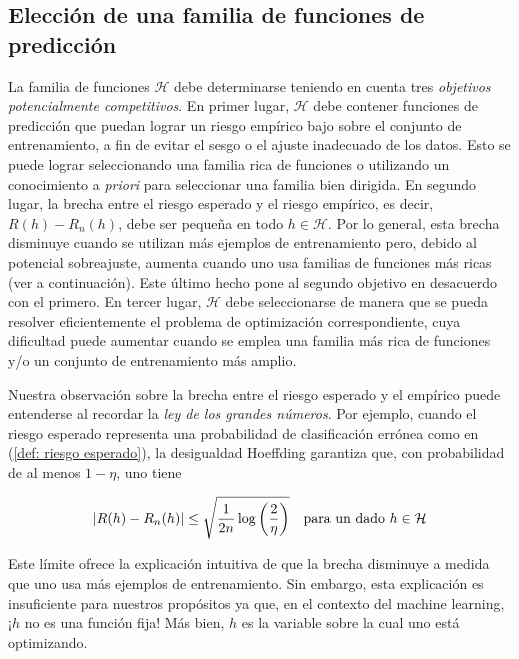 \subsection{Elecci\'on de una familia de funciones de predicci\'on}

La familia de funciones $\mathcal{H}$ debe determinarse teniendo en cuenta tres \textit{objetivos potencialmente competitivos}. En primer lugar, $\mathcal{H}$ debe contener funciones de predicci\'on que puedan lograr un riesgo emp\'irico bajo sobre el conjunto de entrenamiento, a fin de evitar el sesgo o el ajuste inadecuado de los datos. Esto se puede lograr seleccionando una familia rica de funciones o utilizando un conocimiento a \textit{priori} para seleccionar una familia bien dirigida. En segundo lugar, la brecha entre el riesgo esperado y el riesgo emp\'irico, es decir, $R(h) - R_n(h)$, debe ser peque\~na en todo $h \in \mathcal{H}$. Por lo general, esta brecha disminuye cuando se utilizan m\'as ejemplos de entrenamiento pero, debido al potencial sobreajuste, aumenta cuando uno usa familias de funciones m\'as ricas (ver a continuaci\'on). Este \'ultimo hecho pone al segundo objetivo en desacuerdo con el primero. En tercer lugar, $\mathcal{H}$ debe seleccionarse de manera que se pueda resolver eficientemente el problema de optimizaci\'on correspondiente, cuya dificultad puede aumentar cuando se emplea una familia m\'as rica de funciones y/o un conjunto de entrenamiento m\'as amplio.

Nuestra observaci\'on sobre la brecha entre el riesgo esperado y el emp\'irico puede entenderse al recordar la \textit{ley de los grandes n\'umeros}. Por ejemplo, cuando el riesgo esperado representa una probabilidad de clasificaci\'on err\'onea como en (\ref{def: riesgo esperado}), la desigualdad Hoeffding \cite{hoeffding:1962} garantiza que, con probabilidad de al menos $1 - \eta$, uno tiene

\begin{equation}
\left\lvert R(h) - R_n(h)\right\rvert \leq \sqrt{\frac{1}{2n} \log\left(\frac{2}{\eta}\right)} \quad \text{para un dado } h \in \mathcal{H}
\end{equation}

Este l\'imite ofrece la explicaci\'on intuitiva de que la brecha disminuye a medida que uno usa m\'as ejemplos de entrenamiento. Sin embargo, esta explicaci\'on es insuficiente para nuestros prop\'ositos ya que, en el contexto del machine learning, ¡$h$ no es una funci\'on fija! M\'as bien, $h$ es la variable sobre la cual uno est\'a optimizando.

